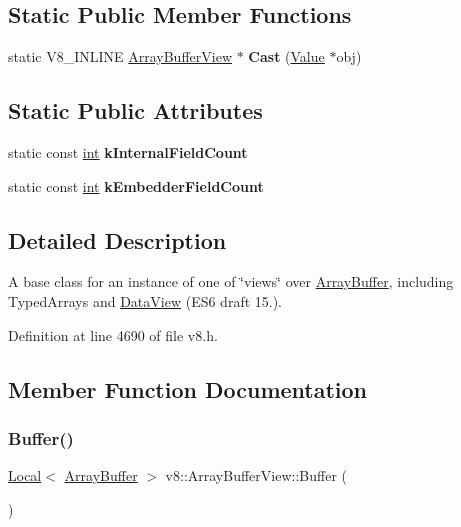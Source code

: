 \subsection*{Static Public Member Functions}
\begin{DoxyCompactItemize}
\item 
\mbox{\label{classv8_1_1ArrayBufferView_a84db315fe904ca1421c0e8e3f615cccb}} 
static V8\+\_\+\+I\+N\+L\+I\+NE \mbox{\hyperlink{classv8_1_1ArrayBufferView}{Array\+Buffer\+View}} $\ast$ {\bfseries Cast} (\mbox{\hyperlink{classv8_1_1Value}{Value}} $\ast$obj)
\end{DoxyCompactItemize}
\subsection*{Static Public Attributes}
\begin{DoxyCompactItemize}
\item 
static const \mbox{\hyperlink{classint}{int}} {\bfseries k\+Internal\+Field\+Count}
\item 
static const \mbox{\hyperlink{classint}{int}} {\bfseries k\+Embedder\+Field\+Count}
\end{DoxyCompactItemize}


\subsection{Detailed Description}
A base class for an instance of one of \char`\"{}views\char`\"{} over \mbox{\hyperlink{classv8_1_1ArrayBuffer}{Array\+Buffer}}, including Typed\+Arrays and \mbox{\hyperlink{classv8_1_1DataView}{Data\+View}} (E\+S6 draft 15.). 

Definition at line 4690 of file v8.\+h.



\subsection{Member Function Documentation}
\mbox{\label{classv8_1_1ArrayBufferView_a134c62b37be7a9e8437a56b832f1800a}} 
\subsubsection{\texorpdfstring{Buffer()}{Buffer()}}
{\footnotesize\ttfamily \mbox{\hyperlink{classv8_1_1Local}{Local}}$<$ \mbox{\hyperlink{classv8_1_1ArrayBuffer}{Array\+Buffer}} $>$ v8\+::\+Array\+Buffer\+View\+::\+Buffer (\begin{DoxyParamCaption}{ }\end{DoxyParamCaption})}

